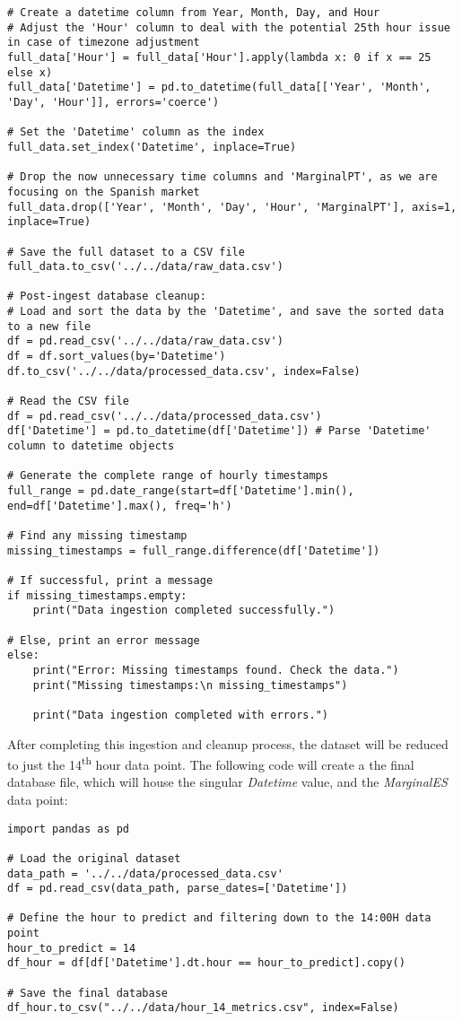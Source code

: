 \documentclass[12pt]{report} %
\begin{document}
\begin{lstlisting}
# Create a datetime column from Year, Month, Day, and Hour
# Adjust the 'Hour' column to deal with the potential 25th hour issue in case of timezone adjustment
full_data['Hour'] = full_data['Hour'].apply(lambda x: 0 if x == 25 else x)
full_data['Datetime'] = pd.to_datetime(full_data[['Year', 'Month', 'Day', 'Hour']], errors='coerce')

# Set the 'Datetime' column as the index
full_data.set_index('Datetime', inplace=True)

# Drop the now unnecessary time columns and 'MarginalPT', as we are focusing on the Spanish market
full_data.drop(['Year', 'Month', 'Day', 'Hour', 'MarginalPT'], axis=1, inplace=True)

# Save the full dataset to a CSV file
full_data.to_csv('../../data/raw_data.csv')

# Post-ingest database cleanup:
# Load and sort the data by the 'Datetime', and save the sorted data to a new file
df = pd.read_csv('../../data/raw_data.csv')
df = df.sort_values(by='Datetime')
df.to_csv('../../data/processed_data.csv', index=False)

# Read the CSV file
df = pd.read_csv('../../data/processed_data.csv')
df['Datetime'] = pd.to_datetime(df['Datetime']) # Parse 'Datetime' column to datetime objects

# Generate the complete range of hourly timestamps
full_range = pd.date_range(start=df['Datetime'].min(), end=df['Datetime'].max(), freq='h')

# Find any missing timestamp
missing_timestamps = full_range.difference(df['Datetime'])

# If successful, print a message
if missing_timestamps.empty:
    print("Data ingestion completed successfully.")

# Else, print an error message
else:
    print("Error: Missing timestamps found. Check the data.")
    print("Missing timestamps:\n missing_timestamps")

    print("Data ingestion completed with errors.")
\end{lstlisting}

After completing this ingestion and cleanup process, the dataset will be reduced to just the 14\textsuperscript{th} hour data point. The following code will create a the final database file, which will house the singular \textit{Datetime} value, and the \textit{MarginalES} data point:

\begin{lstlisting}
import pandas as pd

# Load the original dataset
data_path = '../../data/processed_data.csv'
df = pd.read_csv(data_path, parse_dates=['Datetime'])

# Define the hour to predict and filtering down to the 14:00H data point
hour_to_predict = 14
df_hour = df[df['Datetime'].dt.hour == hour_to_predict].copy()

# Save the final database
df_hour.to_csv("../../data/hour_14_metrics.csv", index=False)
\end{lstlisting}
\end{document}
